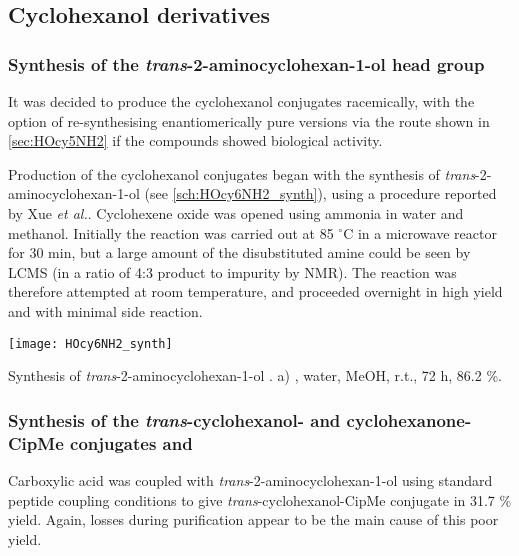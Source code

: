 \subsection{Cyclohexanol derivatives}

\subsubsection{Synthesis of the \textit{trans}-2-aminocyclohexan-1-ol head group }

It was decided to produce the cyclohexanol conjugates racemically, with the option of re-synthesising enantiomerically pure versions via the route shown in \ref{sec:HOcy5NH2} if the compounds showed biological activity.

Production of the cyclohexanol conjugates began with the synthesis of \textit{trans}-2-aminocyclohexan-1-ol  (see \ref{sch:HOcy6NH2_synth}), using a procedure reported by Xue \textit{et al.}\cite{Xue2006}.
Cyclohexene oxide  was opened using ammonia in water and methanol. Initially the reaction was carried out at 85 $^{\circ}$C in a microwave reactor for 30 min, but a large amount of the disubstituted amine could be seen by LCMS (in a ratio of 4:3 product to impurity by NMR). The reaction was therefore attempted at room temperature, and proceeded overnight in high yield and with minimal side reaction.

\begin{scheme}[H]
	\begin{center}
		\texttt{[image: HOcy6NH2\_synth]}
		\caption{Synthesis of \textit{trans}-2-aminocyclohexan-1-ol .
		a) , water, MeOH, r.t., 72 h, 86.2 \%.
		\label{sch:HOcy6NH2_synth}}
	\end{center}
\end{scheme}

\subsubsection{Synthesis of the \textit{trans}-cyclohexanol- and cyclohexanone-CipMe conjugates  and  \label{sec:Ocy6}}

Carboxylic acid  was coupled with \textit{trans}-2-aminocyclohexan-1-ol  using standard peptide coupling conditions to give \textit{trans}-cyclohexanol-CipMe conjugate  in 31.7 \% yield. Again, losses during purification appear to be the main cause of this poor yield.

